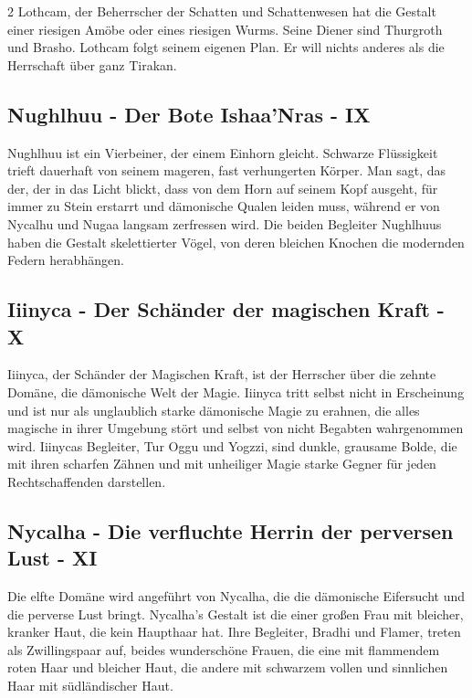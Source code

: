 \begin{multicols*}{2}
Lothcam, der Beherrscher der Schatten und Schattenwesen hat die Gestalt einer riesigen Amöbe oder eines riesigen Wurms.
Seine Diener sind Thurgroth und Brasho.
Lothcam folgt seinem eigenen Plan.
Er will nichts anderes als die Herrschaft über ganz Tirakan.

\subsection{Nughlhuu - Der Bote Ishaa'Nras - IX}\label{subsec:nughlhuu-der-bote-ishaa'nras}

Nughlhuu ist ein Vierbeiner, der einem Einhorn gleicht.
Schwarze Flüssigkeit trieft dauerhaft von seinem mageren, fast verhungerten Körper.
Man sagt, das der, der in das Licht blickt, dass von dem Horn auf seinem Kopf ausgeht, für immer zu Stein erstarrt und dämonische Qualen leiden muss, während er von Nycalhu und Nugaa langsam zerfressen wird.
Die beiden Begleiter Nughlhuus haben die Gestalt skelettierter Vögel, von deren bleichen Knochen die modernden Federn herabhängen.

\subsection{Iiinyca - Der Schänder der magischen Kraft - X}\label{subsec:iiinyca-der-schander-der-magischen-kraft}

Iiinyca, der Schänder der Magischen Kraft, ist der Herrscher über die zehnte Domäne, die dämonische Welt der Magie.
Iiinyca tritt selbst nicht in Erscheinung und ist nur als unglaublich starke dämonische Magie zu erahnen, die alles magische in ihrer Umgebung stört und selbst von nicht Begabten wahrgenommen wird.
Iiinycas Begleiter, Tur Oggu und Yogzzi, sind dunkle, grausame Bolde, die mit ihren scharfen Zähnen und mit unheiliger Magie starke Gegner für jeden Rechtschaffenden darstellen.

\subsection{Nycalha - Die verfluchte Herrin der perversen Lust - XI}\label{subsec:nycalha-die-verfluchte-herrin-der-perversen-lust}

Die elfte Domäne wird angeführt von Nycalha, die die dämonische Eifersucht und die perverse Lust bringt.
Nycalha's Gestalt ist die einer großen Frau mit bleicher, kranker Haut, die kein Haupthaar hat.
Ihre Begleiter, Bradhi und Flamer, treten als Zwillingspaar auf, beides wunderschöne Frauen, die eine mit flammendem roten Haar und bleicher Haut, die andere mit schwarzem vollen und sinnlichen Haar mit südländischer Haut.


\end{multicols*}
